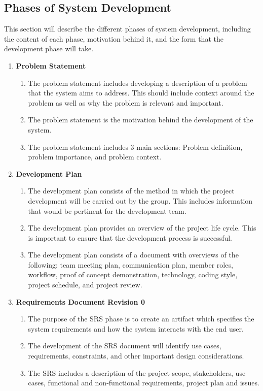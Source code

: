 \documentclass[]{article}
\begin{document}
\subsection{Phases of System Development}
\label{sub:apportioning_of_requirements}
This section will describe the different phases of system development, including the content of each phase, motivation behind it, and the form that the development phase will take.
\begin{enumerate}[ ]
	\item \textbf{Problem Statement}
	    \begin{enumerate}[1.]
	        \item The problem statement includes developing a description of a problem that the system aims to address. This should include context around the problem as well as why the problem is relevant and important.
            \item The problem statement is the motivation behind the development of the system.
	        \item The problem statement includes 3 main sections: Problem definition, problem importance, and problem context.
	    \end{enumerate}
	    
	\item \textbf{Development Plan}
	    \begin{enumerate}[1.]
	        \item The development plan consists of the method in which the project development will be carried out by the group. This includes information that would be pertinent for the development team.
	        \item The development plan provides an overview of the project life cycle. This is important to ensure that the development process is successful.
	        \item The development plan consists of a document with overviews of the following: team meeting plan, communication plan, member roles, workflow, proof of concept demonstration, technology, coding style, project schedule, and project review.
	    \end{enumerate}
	    
	\item \textbf{Requirements Document Revision 0}
	    \begin{enumerate}[1.]
	        \item The purpose of the SRS phase is to create an artifact which specifies the system requirements and how the system interacts with the end user.
	        \item The development of the SRS document will identify use cases, requirements, constraints, and other important design considerations.
	        \item The SRS includes a description of the project scope, stakeholders, use cases, functional and non-functional requirements, project plan and issues.
	    \end{enumerate}
	    

\end{enumerate}
\end{document}
